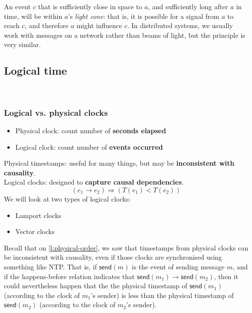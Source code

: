 An event $c$ that is sufficiently close in space to $a$, and sufficiently long after $a$ in time, will be within $a$'s \emph{light cone}: that is, it is possible for a signal from $a$ to reach $c$, and therefore $a$ might influence $c$.
In distributed systems, we usually work with messages on a network rather than beams of light, but the principle is very similar.



\subsection{Logical time}\label{sec:logical-time}

\begin{frame}
    \begin{center}
        {\Large{\color{darkblue}{Broadcast protocols and logical time}}} \\[2em]
        \mydetails
    \end{center}
\end{frame}


\begin{frame}
    \label{s:logical-clocks}
    \frametitle{Logical vs. physical clocks}
    \begin{itemize}
        \item Physical clock: count number of \textbf{seconds elapsed}
        \item Logical clock: count number of \textbf{events occurred}\\[1em]
    \end{itemize}
    Physical timestamps: useful for many things, but may be \textbf{inconsistent with causality}.\\[1em]\pause
    Logical clocks: designed to \textbf{capture causal dependencies}.
    \[ (e_1 \rightarrow e_2) \Longrightarrow (T(e_1) < T(e_2)) \]\pause
    We will look at two types of logical clocks:
    \begin{itemize}
        \item Lamport clocks
        \item Vector clocks
    \end{itemize}
\end{frame}
\label{l:logical-clocks}

Recall that on \autoref{l:physical-order}, we saw that timestamps from physical clocks can be inconsistent with causality, even if those clocks are synchronised using something like NTP.
That is, if $\mathsf{send}(m)$ is the event of sending message $m$, and if the happens-before relation indicates that $\mathsf{send}(m_1) \rightarrow \mathsf{send}(m_2)$, then it could nevertheless happen that the the physical timestamp of $\mathsf{send}(m_1)$ (according to the clock of $m_1$'s sender) is less than the physical timestamp of $\mathsf{send}(m_2)$ (according to the clock of $m_2$'s sender).


